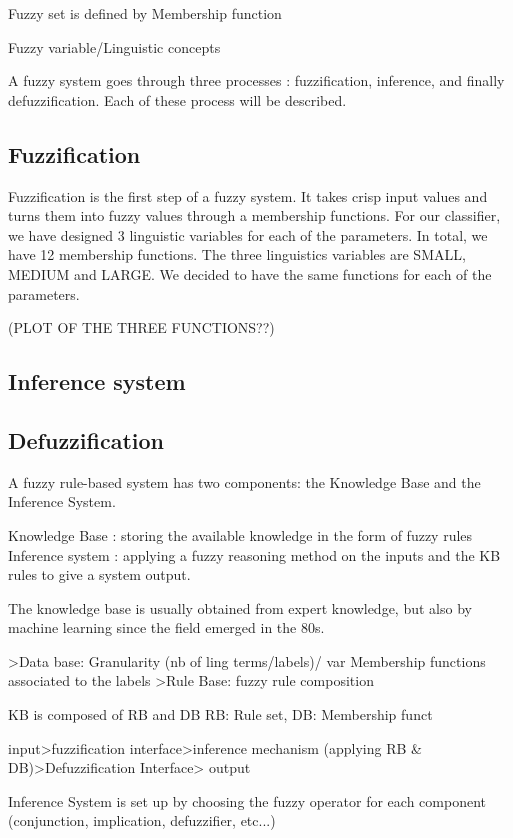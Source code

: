 \documentclass[a4paper,12pt]{article}
\begin{document}
Fuzzy set is defined by Membership function

Fuzzy variable/Linguistic concepts

A fuzzy system goes through three processes : fuzzification, inference, and finally defuzzification. Each of these process will be described.


\subsection{Fuzzification}

Fuzzification is the first step of a fuzzy system. It takes crisp input values and turns them into fuzzy values through a membership functions.
For our classifier, we have designed 3 linguistic variables for each of the parameters. In total, we have 12 membership functions.
The three linguistics variables are SMALL, MEDIUM and LARGE. We decided to have the same functions for each of the parameters.

(PLOT OF THE THREE FUNCTIONS??)

\subsection{Inference system}

\subsection{Defuzzification}


A fuzzy rule-based system has two components: the Knowledge Base and the Inference System.

Knowledge Base : storing the available knowledge in the form of fuzzy rules
Inference system : applying a fuzzy reasoning method on the inputs and the KB rules to give a system output.


The knowledge base is usually obtained from expert knowledge, but also by machine learning since the field emerged in the 80s.

>Data base:
Granularity (nb of ling terms/labels)/ var
Membership functions associated to the labels
>Rule Base: fuzzy rule composition

KB is composed of RB and DB
RB: Rule set, DB: Membership funct

input>fuzzification interface>inference mechanism (applying RB \& DB)>Defuzzification Interface> output






Inference System is set up by choosing the fuzzy operator for each component (conjunction, implication, defuzzifier, etc...)
\end{document}
